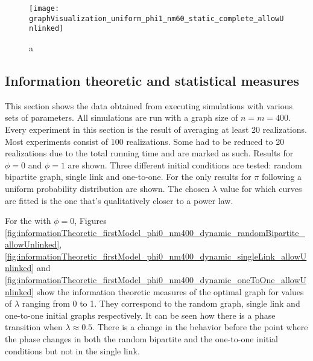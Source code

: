 \begin{figure}
  \centering
  \texttt{[image: graphVisualization\_uniform\_phi1\_nm60\_static\_complete\_allowUnlinked]}
  \caption{a}
  \label{fig:graphVisualization_uniform_phi1_nm60_static_complete_allowUnlinked}
\end{figure}


\subsection{Information theoretic and statistical measures}
\label{sec:results_new_other}

This section shows the data obtained from executing simulations with various sets of parameters.
All simulations are run with a graph size of $n=m=400$.
Every experiment in this section is the result of averaging at least 20 realizations.
Most experiments consist of 100 realizations.
Some had to be reduced to 20 realizations due to the total running time and are marked as such.
Results for $\phi=0$ and $\phi=1$ are shown.
Three different initial conditions are tested: random bipartite graph, single link and one-to-one.
For the \secondmodel{} only results for $\pi$ following a uniform probability distribution are shown.
The chosen $\lambda$ value for which curves are fitted is the one that's qualitatively closer to a power law.

For the \firstmodel{} with $\phi=0$, Figures \ref{fig:informationTheoretic_firstModel_phi0_nm400_dynamic_randomBipartite_allowUnlinked}, \ref{fig:informationTheoretic_firstModel_phi0_nm400_dynamic_singleLink_allowUnlinked} and \ref{fig:informationTheoretic_firstModel_phi0_nm400_dynamic_oneToOne_allowUnlinked} show the information theoretic measures of the optimal graph for values of $\lambda$ ranging from 0 to 1.
They correspond to the random graph, single link and one-to-one initial graphs respectively. It can be seen how there is a phase transition when $\lambda \approx 0.5$.
There is a change in the behavior before the point where the phase changes in both the random bipartite and the one-to-one initial conditions but not in the single link.

